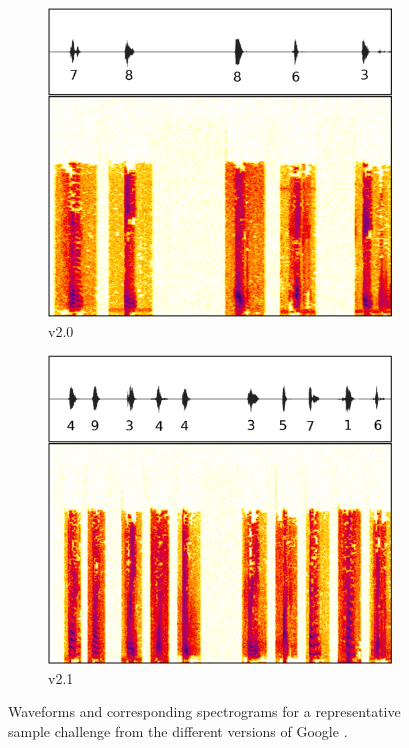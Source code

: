 \begin{figure}[tp]
\begin{subfigure}{0.23\textwidth}
        \includegraphics[width=\textwidth]{figures/recaptcha2a.pdf}
        \caption{\re v2.0}
        \label{fig:recaptcha2a}
\end{subfigure}\hspace{0.01\textwidth}
\begin{subfigure}{0.23\textwidth}
        \includegraphics[width=\textwidth]{figures/recaptcha2b.pdf}
        \caption{\re v2.1}
        \label{fig:recaptcha2b}
\end{subfigure}
\caption{Waveforms and corresponding spectrograms for a representative sample challenge from the different versions of Google \re.}
\label{fig:re_examples}
\end{figure}

